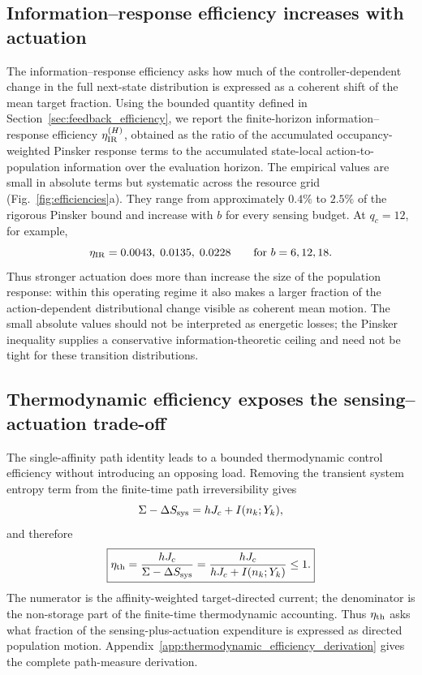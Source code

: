 \subsection{Information--response efficiency increases with actuation}

The information--response efficiency asks how much of the controller-dependent
change in the full next-state distribution is expressed as a coherent shift of
the mean target fraction. Using the bounded quantity defined in
Section~\ref{sec:feedback_efficiency}, we report the finite-horizon
information--response efficiency $\eta_{\rm IR}^{(H)}$, obtained as the ratio
of the accumulated occupancy-weighted Pinsker response terms to the accumulated
state-local action-to-population information over the evaluation horizon. The
empirical values are small in absolute terms but systematic across the resource grid
(Fig.~\ref{fig:efficiencies}a). They range from approximately $0.4\%$ to $2.5\%$ of
the rigorous Pinsker bound and increase with $b$ for every sensing budget. At
$q_c=12$, for example,
\[
\eta_{\rm IR}=0.0043,\;0.0135,\;0.0228
\qquad\text{for } b=6,12,18.
\]
Thus stronger actuation does more than increase the size of the population
response: within this operating regime it also makes a larger fraction of the
action-dependent distributional change visible as coherent mean motion. The
small absolute values should not be interpreted as energetic losses; the
Pinsker inequality supplies a conservative information-theoretic ceiling and
need not be tight for these transition distributions.



\subsection{Thermodynamic efficiency exposes the sensing--actuation trade-off}

The single-affinity path identity leads to a bounded thermodynamic control
efficiency without introducing an opposing load. Removing the transient system
entropy term from the finite-time path irreversibility gives
\[
\Sigma-\Delta S_{\rm sys}=hJ_c+I(n_k;Y_k),
\]
and therefore
\[
\boxed{
\eta_{\rm th}
=
\frac{hJ_c}{\Sigma-\Delta S_{\rm sys}}
=
\frac{hJ_c}{hJ_c+I(n_k;Y_k)}
\le 1.}
\]
The numerator is the affinity-weighted target-directed current; the denominator
is the non-storage part of the finite-time thermodynamic accounting. Thus
$\eta_{\rm th}$ asks what fraction of the sensing-plus-actuation expenditure is
expressed as directed population motion. Appendix~\ref{app:thermodynamic_efficiency_derivation}
gives the complete path-measure derivation.

